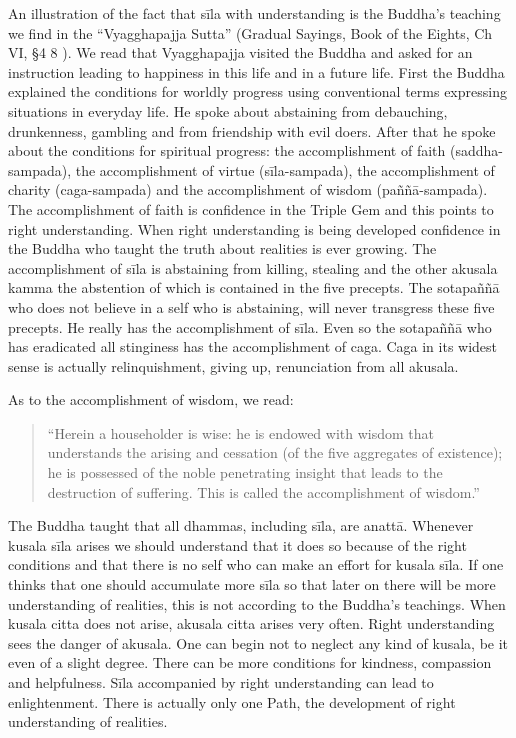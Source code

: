 An illustration of the fact that sīla with understanding is the Buddha’s teaching we 
find in the ``Vyagghapajja Sutta'' (Gradual Sayings, Book of the Eights, Ch VI, §4 8 ). 
We read that Vyagghapajja visited the Buddha and asked for an instruction leading to 
happiness in this life and in a future life. First the Buddha explained the conditions 
for worldly progress using conventional terms expressing situations in everyday life. 
He spoke about abstaining from debauching, drunkenness, gambling and from friendship with evil doers. After that he spoke about the conditions for spiritual progress: 
the accomplishment of faith (saddha-sampada), the accomplishment of virtue (sīla-sampada), the accomplishment of charity (caga-sampada) and the accomplishment of 
wisdom (paññā-sampada). The accomplishment of faith is confidence in the Triple 
Gem and this points to right understanding. When right understanding is being developed confidence in the Buddha who taught the truth about realities is ever growing. 
The accomplishment of sīla is abstaining from killing, stealing and the other akusala 
kamma the abstention of which is contained in the five precepts. The sotapaññā who 
does not believe in a self who is abstaining, will never transgress these five precepts. 
He really has the accomplishment of sīla. Even so the sotapaññā who has eradicated 
all stinginess has the accomplishment of caga. Caga in its widest sense is actually relinquishment, giving up, renunciation from all akusala. 

As to the accomplishment of wisdom, we read: 

\begin{quote}

``Herein a householder is wise: he is endowed with wisdom that understands the arising and cessation (of the five aggregates of existence); he is possessed of the noble penetrating insight that leads to the 
destruction of suffering. This is called the accomplishment of wisdom.'' 
\end{quote}

The Buddha taught that all dhammas, including sīla, are anattā. Whenever kusala sīla 
arises we should understand that it does so because of the right conditions and that 
there is no self who can make an effort for kusala sīla. If one thinks that one should 
accumulate more sīla so that later on there will be more understanding of realities, 
this is not according to the Buddha’s teachings. When kusala citta does not arise, akusala citta arises very often. Right understanding sees the danger of akusala. One can 
begin not to neglect any kind of kusala, be it even of a slight degree. There can be more conditions for kindness, compassion and helpfulness. Sīla accompanied by right 
understanding can lead to enlightenment. There is actually only one Path, the development of right understanding of realities. 

